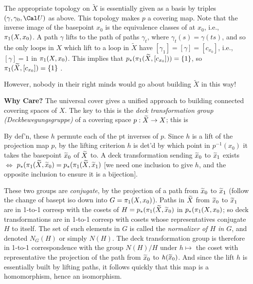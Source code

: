 \ssk


The appropriate topology on $\widetilde{X}$ is essentially given as a basis
by triples $(\gamma,\gamma_0,{\Cal U})$ as above. This topology makes $p$ a covering map.
Note that the inverse image of 
the basepoint $x_0$ is the equivalence classes of  at $x_0$,
i.e., $\pi_1(X,x_0)$. A path $\gamma$ lifts to the path of paths
$\gamma_t$, where $\gamma_t(s)=\gamma(ts)$, and so the only 
loops in $X$ which lift to a loop in $\widetilde{X}$ have
$[\gamma_1]=[\gamma]=[c_{x_0}]$, i.e., $[\gamma]=1$ in $\pi_1(X,x_0)$. This
implies that $p_*(\pi_1(\widetilde{X},[c_{x_0}]))=\{1\}$, so 
$\pi_1(\widetilde{X},[c_{x_0}])=\{1\}$ . 

\msk

However, nobody in their
right minds would go about building $\widetilde{X}$ in this way!


\vfill
\eject

{\bf Why Care?} The universal cover gives
a unified approach to building  connected covering
spaces of $X$. The key to this is the {\it deck transformation group
(Deckbewegungsgruppe)}
of a covering space $p:\widetilde{X}\rightarrow X$; this is 

\ssk

By def'n, these $h$ permute each of the pt inverses
of $p$. Since $h$ is a lift of the projection map
$p$, by the lifting criterion $h$ is det'd by which point in $p^{-1}(x_0)$ 
it takes the basepoint 
$\widetilde{x}_0$ of $\widetilde{X}$ to. A deck transformation sending
$\widetilde{x}_0$ to $\widetilde{x}_1$ exists $\Leftrightarrow$
$p_*(\pi_1(\widetilde{X},\widetilde{x}_0)=p_*(\pi_1(\widetilde{X},\widetilde{x}_1)$
[we need one inclusion to give $h$, and the opposite inclusion
to ensure it is a bijection]. 

\msk

These two groups
are {\it conjugate}, by the projection of a path from 
$\widetilde{x}_0$ to $\widetilde{x}_1$ (follow the change
of basept iso down into $G=\pi_1(X,x_0)$). 
Paths in $\widetilde{X}$ from $\widetilde{x}_0$ to $\widetilde{x}_1$ are in 1-to-1
corresp with the cosets of $H=p_*(\pi_1(\widetilde{X},\widetilde{x}_0)$ in 
$p_*(\pi_1({X},{x}_0)$; so deck transformations are in 1-to-1 
corresp with cosets whose representatives conjugate 
$H$ to itself. The set of such elements in $G$ is called the 
{\it normalizer of $H$ in $G$}, and denoted $N_G(H)$ or simply
$N(H)$. The deck transformation group is therefore
in 1-to-1 correspondence with the group $N(H)/H$ under
$h\mapsto$ the coset with representative the projection of the path from 
$\widetilde{x}_0$ to $h(\widetilde{x}_0)$. And since the lift $h$ is essentially built
by lifting paths, it follows quickly that this map is a
homomorphism, hence an isomorphism.


